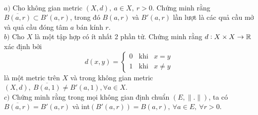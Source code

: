 \begin{exercise}{5}\\
    $a)$ Cho không gian metric $(X, d),\ a\in X,\ r > 0$. Chứng minh rằng $\overline{B(a,r)} \subset B'(a,r)$, trong đó $B(a,r)$ và $B'(a,r)$ lần lượt là các quả cầu mở và quả cầu đóng tâm $a$ bán kính $r$.\\[3mm]
    $b)$ Cho $X$ là một tập hợp có ít nhất 2 phần tử. Chứng minh rằng $d: X \times X \rightarrow \mathbb R$ xác định bởi
    $$
        d(x,y) =
        \begin{cases}
            0\ \ \ \ \text{khi} & x=y\\
            1\ \ \ \ \text{khi} & x \neq y
        \end{cases}
    $$
    là một metric trên $X$ và trong không gian metric $(X, d),\ \overline{B(a,1)} \neq B'(a,1), \forall a \in X$.\\[3mm]
    $c)$ Chứng minh rằng trong mọi không gian định chuẩn $(E, \|.\|)$, ta có $\overline{B(a,r)} = B'(a,r)$ và int$(B'(a,r)) = B(a,r),\ \forall a \in E,\ \forall r > 0$.
\end{exercise}

